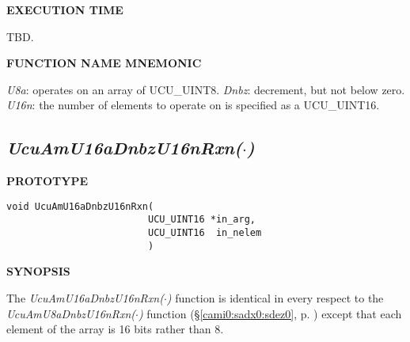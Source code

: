 \noindent\textbf{EXECUTION TIME}
\begin{list}{}{\setlength{\leftmargin}{0.25in}\setlength{\topsep}{0.0in}}
\item TBD.
\end{list}
\vspace{2.8ex}

\noindent\textbf{FUNCTION NAME MNEMONIC}
\begin{list}{}{\setlength{\leftmargin}{0.25in}\setlength{\topsep}{0.0in}}
\item \emph{U8a}:   operates on an array of UCU\_UINT8.
      \emph{Dnbz}:  decrement, but not below zero.
      \emph{U16n}:  the number of elements to operate on is specified
                    as a UCU\_UINT16.
\end{list}


\subsection[\emph{UcuAmU16aDnbzU16nRxn(\protect\mbox{\protect$\cdot$})}]
           {\emph{UcuAmU16aDnbzU16nRxn(\protect\mbox{\protect\boldmath $\cdot$})}}
\label{cami0:sadx0:sdez1}

%

\noindent\textbf{PROTOTYPE}
\begin {list}{}{\setlength{\leftmargin}{0.25in}\setlength{\topsep}{0.0in}}
\item
\begin{verbatim}
void UcuAmU16aDnbzU16nRxn(
                         UCU_UINT16 *in_arg,
                         UCU_UINT16  in_nelem
                         )
\end{verbatim}
\end{list}
\vspace{2.8ex}

\noindent\textbf{SYNOPSIS}
\begin{list}{}{\setlength{\leftmargin}{0.25in}\setlength{\topsep}{0.0in}}
\item The \emph{UcuAmU16aDnbzU16nRxn($\cdot$)} function is identical in every
      respect to the \emph{UcuAmU8aDnbzU16nRxn($\cdot$)} function
      (\S{}\ref{cami0:sadx0:sdez0}, p. \pageref{cami0:sadx0:sdez0})
      except that each element of the array is 16 bits
      rather than 8.
\end{list}
\vspace{2.8ex}


